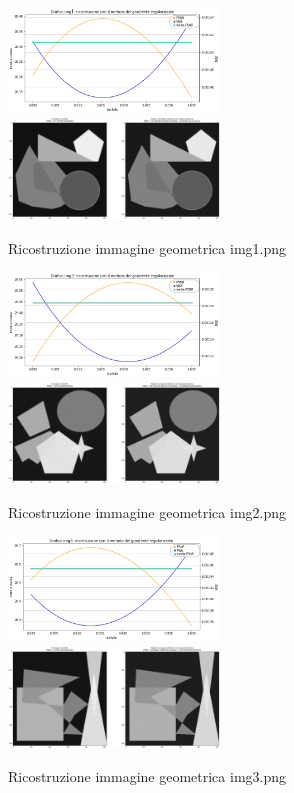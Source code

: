 \begin{figure}[H]
    \includegraphics[width=0.5\textwidth]{IMMAGINI_RELAZIONE/grafico1Tik.png}
    \includegraphics[width=0.5\textwidth]{IMMAGINI_RELAZIONE/ricostruzione1Tik.png}
    \caption{Ricostruzione immagine geometrica img1.png}

    \includegraphics[width=0.5\textwidth]{IMMAGINI_RELAZIONE/grafico2Tik.png}
    \includegraphics[width=0.5\textwidth]{IMMAGINI_RELAZIONE/ricostruzione2Tik.png}
    \caption{Ricostruzione immagine geometrica img2.png}

    \includegraphics[width=0.5\textwidth]{IMMAGINI_RELAZIONE/grafico3Tik.png}
    \includegraphics[width=0.5\textwidth]{IMMAGINI_RELAZIONE/ricostruzione3Tik.png}
    \caption{Ricostruzione immagine geometrica img3.png}


\end{figure}
